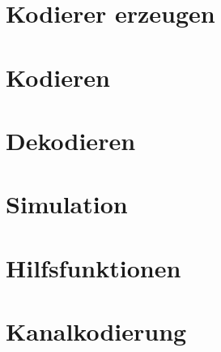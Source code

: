 
\section{Kodierer erzeugen}
\label{chapter:interface_kodierer_erzeugen}




\section{Kodieren}
\label{chapter:interface_kodieren}


\section{Dekodieren}
\label{chapter:interface_kodieren}




\section{Simulation}
\label{chapter:interface_simulation}


\section{Hilfsfunktionen}
\label{chapter:interface_hilfsfunktionen}




\section{Kanalkodierung}
\label{chapter:interface_kanalkodierung}




